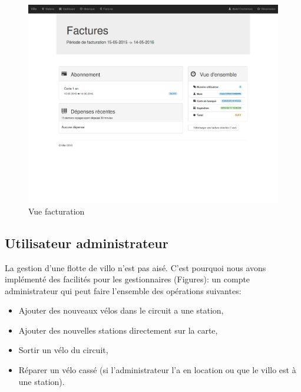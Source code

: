 \documentclass[a4paper,10pt]{article}
\begin{document}
\begin{figure}[H]
  \centering
  \includegraphics[width=.9\textwidth]{factures.png}
  \caption{\label{fig:factures} Vue facturation}
\end{figure}

\subsection{Utilisateur administrateur}
La gestion d'une flotte de villo n'est pas aisé. C'est pourquoi nous avons implémenté
des facilités pour les gestionnaires (Figures): un compte administrateur qui peut faire
l'ensemble des opérations suivantes: 
\begin{itemize}
	\item Ajouter des nouveaux vélos dans le circuit a une station,
	\item Ajouter des nouvelles stations directement sur la carte,
	\item Sortir un vélo du circuit,
	\item Réparer un vélo cassé (si l'administrateur l'a en location ou que le villo est à une station).
\end{itemize}
\end{document}
